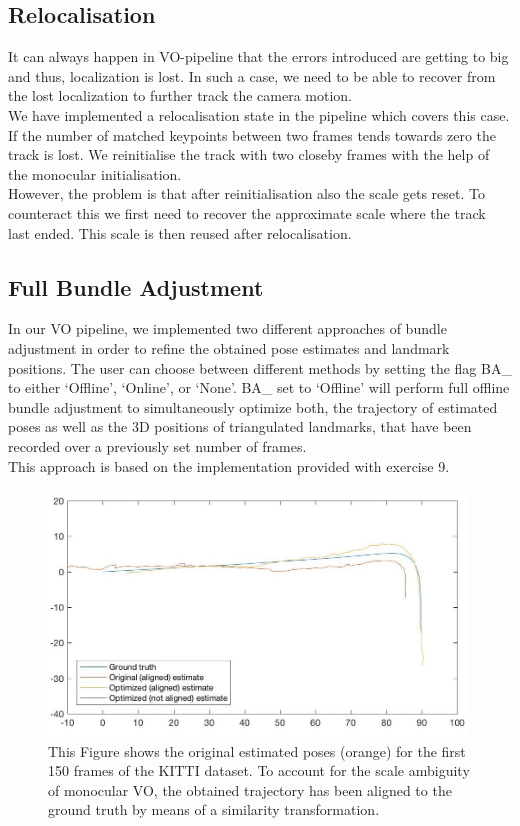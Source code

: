 \subsection{Relocalisation}
It can always happen in VO-pipeline that the errors introduced are getting to big and thus, localization is lost. In such a case, we need to be able to recover from the lost localization to further track the camera motion. \\
We have implemented a relocalisation state in the pipeline which covers this case. If the number of matched keypoints between two frames tends towards zero the track is lost. We reinitialise the track with two closeby frames with the help of the monocular initialisation. \\
However, the problem is that after reinitialisation also the scale gets reset. To counteract this we first need to recover the approximate scale where the track last ended. This scale is then reused after relocalisation. 

\subsection{Full Bundle Adjustment}

In our VO pipeline, we implemented two different approaches of bundle adjustment in order to refine the obtained pose estimates and landmark positions. The user can choose between different methods by setting the flag BA\_ to either ‘Offline’, ‘Online’, or ‘None’. 
BA\_ set to ‘Offline’ will perform full offline bundle adjustment to simultaneously optimize both, the trajectory of estimated poses as well as the 3D positions of triangulated landmarks, that have been recorded over a previously set number of frames. \\
This approach is based on the implementation provided with exercise 9. 

\begin{figure}
\includegraphics[width=0.99\textwidth]{files/aligned_optimized.jpg}
\caption[\label{f:aligned_optimized}Offline Bundle Adjustment]{This Figure shows the original estimated poses (orange) for the first 150 frames of the KITTI dataset. To account for the scale ambiguity of monocular VO, the obtained trajectory has been aligned to the ground truth by means of a similarity transformation.}
\end{figure}

